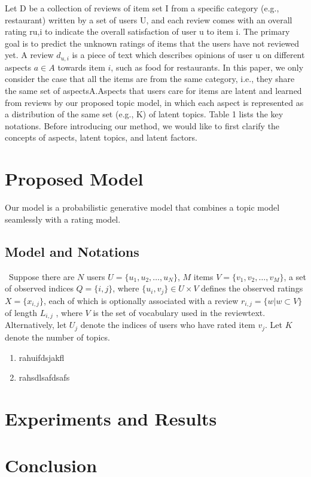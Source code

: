 \documentclass[10pt,conference]{IEEEtran}
\begin{document}
Let D be a collection of reviews of item set I from a specific category (e.g., restaurant) written by a set of users U, and each review comes with an overall rating ru,i to indicate the overall satisfaction of user u to item i. The primary goal is to predict the unknown ratings of items that the users have not reviewed yet. A review $d_{u,i}$ is a piece of text which describes opinions of user u on different aspects $a \in A$ towards item $i$, such as food for restaurants. In this paper, we only consider the case that all the items are from the same category, i.e., they share the same set of aspectsA.Aspects that users care for items are latent and learned from reviews by our proposed topic model, in which each aspect is represented as a distribution of the same set (e.g., K) of latent topics. Table 1 lists the key notations. Before introducing our method, we would like to first clarify the concepts of aspects, latent topics, and latent factors.

\section{Proposed Model}
Our model is a probabilistic generative model that combines a topic model seamlessly with a rating model. 

\subsection{Model and Notations}\
Suppose there are $N$ users $U = \{u_1,u_2, \dots ,u_N\}$, $M$ items
$V = \{v_1, v_2, \dots , v_M\}$, a set of observed indices $Q = \{i, j\}$, where $\{u_i, v_j\} \in U \times V$ defines the observed ratings $X = \{x_{i,j}\}$, each of which is optionally associated with a review $r_{i,j} = \{w|w \subset V\}$ of length $L_{i,j}$ , where $V$ is the set of vocabulary used in the reviewtext. Alternatively, let $U_j$ denote the indices of users who have rated item $v_j$. Let $K$ denote the number of topics.

\begin{enumerate}

	\item rahuifdsjakfl
	\item rahsdlsafdsafs

\end{enumerate}



\section{Experiments and Results}

\section{Conclusion}

\newpage



\end{document}
